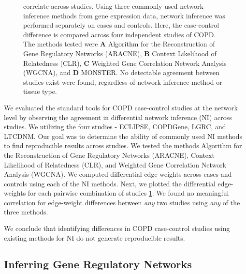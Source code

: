 \documentclass[9pt,twocolumn,twoside]{pnas-new}
\begin{document}
\begin{figure}[h]
{{correlate across studies.} Using three commonly used network inference
methods from gene expression data, network inference was performed
separately on cases and controls. Here, the case-control difference
is compared across four independent studies of COPD. The methods tested
were \textbf{A} Algorithm for the Reconstruction of Gene Regulatory
Networks (ARACNE), \textbf{B} Context Likelihood of Relatedness (CLR),
\textbf{C} Weighted Gene Correlation Network Analysis (WGCNA), and
\textbf{D} MONSTER. No detectable agreement between studies exist
were found, regardless of network inference method or tissue type.}
\label{fig:Supplement NI edgeweight plots}
\end{figure}

We evaluated the standard tools for COPD case-control studies at the
network level by observing the agreement in differential network inference
(NI) across studies. We utilizing the four studies - ECLIPSE, COPDGene,
LGRC, and LTCDNM. Our goal was to determine the ability of commonly
used NI methods to find reproducible results across studies. We tested
the methods Algorithm for the Reconstruction of Gene Regulatory Networks
(ARACNE), Context Likelihood of Relatedness (CLR), and Weighted Gene
Correlation Network Analysis (WGCNA). We computed differential edge-weights
across cases and controls using each of the NI methods. Next, we plotted
the differential edge-weights for each pairwise combination of studies
\ref{fig:Supplement NI edgeweight plots}. We found no meaningful
correlation for edge-weight differences between \emph{any} two studies
using \emph{any} of the three methods. 


We conclude that identifying differences in COPD case-control studies
using existing methods for NI do not generate reproducible results.

\subsection*{Inferring Gene Regulatory Networks}
\end{document}
